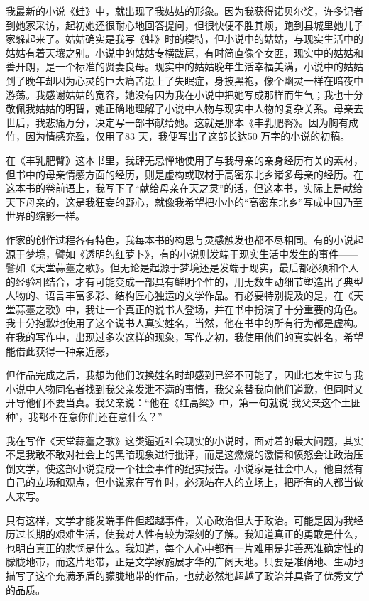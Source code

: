 \documentclass[fontset=fandol,12pt,a5paper]{ctexbook}
\begin{document}
我最新的小说《蛙》中，就出现了我姑姑的形象。因为我获得诺贝尔奖，许多记者到她家采访，起初她还很耐心地回答提问，但很快便不胜其烦，跑到县城里她儿子家躲起来了。姑姑确实是我写《蛙》时的模特，但小说中的姑姑，与现实生活中的姑姑有着天壤之别。小说中的姑姑专横跋扈，有时简直像个女匪，现实中的姑姑和善开朗，是一个标准的贤妻良母。现实中的姑姑晚年生活幸福美满，小说中的姑姑到了晚年却因为心灵的巨大痛苦患上了失眠症，身披黑袍，像个幽灵一样在暗夜中游荡。我感谢姑姑的宽容，她没有因为我在小说中把她写成那样而生气；我也十分敬佩我姑姑的明智，她正确地理解了小说中人物与现实中人物的复杂关系。母亲去世后，我悲痛万分，决定写一部书献给她。这就是那本《丰乳肥臀》。因为胸有成竹，因为情感充盈，仅用了83 天，我便写出了这部长达50 万字的小说的初稿。

在《丰乳肥臀》这本书里，我肆无忌惮地使用了与我母亲的亲身经历有关的素材，但书中的母亲情感方面的经历，则是虚构或取材于高密东北乡诸多母亲的经历。在这本书的卷前语上，我写下了“献给母亲在天之灵”的话，但这本书，实际上是献给天下母亲的，这是我狂妄的野心，就像我希望把小小的“高密东北乡”写成中国乃至世界的缩影一样。

作家的创作过程各有特色，我每本书的构思与灵感触发也都不尽相同。有的小说起源于梦境，譬如《透明的红萝卜》，有的小说则发端于现实生活中发生的事件——譬如《天堂蒜薹之歌》。但无论是起源于梦境还是发端于现实，最后都必须和个人的经验相结合，才有可能变成一部具有鲜明个性的，用无数生动细节塑造出了典型人物的、语言丰富多彩、结构匠心独运的文学作品。有必要特别提及的是，在《天堂蒜薹之歌》中，我让一个真正的说书人登场，并在书中扮演了十分重要的角色。我十分抱歉地使用了这个说书人真实姓名，当然，他在书中的所有行为都是虚构。在我的写作中，出现过多次这样的现象，写作之初，我使用他们的真实姓名，希望能借此获得一种亲近感，

但作品完成之后，我想为他们改换姓名时却感到已经不可能了，因此也发生过与我小说中人物同名者找到我父亲发泄不满的事情，我父亲替我向他们道歉，但同时又开导他们不要当真。我父亲说：“他在《红高粱》中，第一句就说‘我父亲这个土匪种’，我都不在意你们还在意什么？”

我在写作《天堂蒜薹之歌》这类逼近社会现实的小说时，面对着的最大问题，其实不是我敢不敢对社会上的黑暗现象进行批评，而是这燃烧的激情和愤怒会让政治压倒文学，使这部小说变成一个社会事件的纪实报告。小说家是社会中人，他自然有自己的立场和观点，但小说家在写作时，必须站在人的立场上，把所有的人都当做人来写。

只有这样，文学才能发端事件但超越事件，关心政治但大于政治。可能是因为我经历过长期的艰难生活，使我对人性有较为深刻的了解。我知道真正的勇敢是什么，也明白真正的悲悯是什么。我知道，每个人心中都有一片难用是非善恶准确定性的朦胧地带，而这片地带，正是文学家施展才华的广阔天地。只要是准确地、生动地描写了这个充满矛盾的朦胧地带的作品，也就必然地超越了政治并具备了优秀文学的品质。
\end{document}
